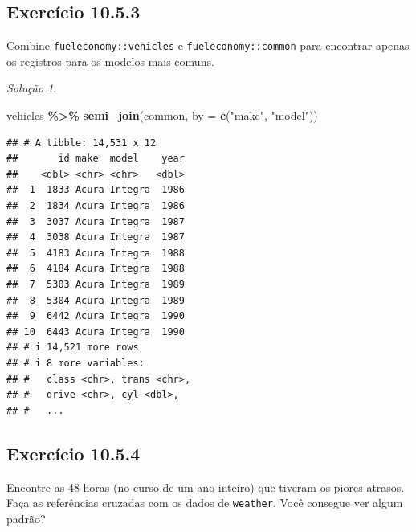 \documentclass[
]{latex/krantz}
\newenvironment{Shaded}{\begin{snugshade}}{\end{snugshade}}
\newcommand{\AttributeTok}[1]{\textcolor[rgb]{0.13,0.29,0.53}{#1}}
\newcommand{\FunctionTok}[1]{\textcolor[rgb]{0.13,0.29,0.53}{\textbf{#1}}}
\newcommand{\NormalTok}[1]{#1}
\newcommand{\SpecialCharTok}[1]{\textcolor[rgb]{0.81,0.36,0.00}{\textbf{#1}}}
\newcommand{\StringTok}[1]{\textcolor[rgb]{0.31,0.60,0.02}{#1}}
\theoremstyle{definition}
\theoremstyle{definition}
\theoremstyle{definition}
\theoremstyle{definition}
\theoremstyle{remark}
\newtheorem*{solution}{Solução}
\begin{document}
\hypertarget{exr10-5-3}{%
\subsection*{Exercício 10.5.3}\label{exr10-5-3}}

Combine \texttt{fueleconomy::vehicles} e \texttt{fueleconomy::common} para encontrar apenas os registros para os modelos mais comuns.

\begin{solution}
\leavevmode

\begin{Shaded}
\begin{Highlighting}[]
\NormalTok{vehicles }\SpecialCharTok{\%\textgreater{}\%}
  \FunctionTok{semi\_join}\NormalTok{(common, }\AttributeTok{by =} \FunctionTok{c}\NormalTok{(}\StringTok{"make"}\NormalTok{, }\StringTok{"model"}\NormalTok{))}
\end{Highlighting}
\end{Shaded}

\begin{verbatim}
## # A tibble: 14,531 x 12
##       id make  model    year
##    <dbl> <chr> <chr>   <dbl>
##  1  1833 Acura Integra  1986
##  2  1834 Acura Integra  1986
##  3  3037 Acura Integra  1987
##  4  3038 Acura Integra  1987
##  5  4183 Acura Integra  1988
##  6  4184 Acura Integra  1988
##  7  5303 Acura Integra  1989
##  8  5304 Acura Integra  1989
##  9  6442 Acura Integra  1990
## 10  6443 Acura Integra  1990
## # i 14,521 more rows
## # i 8 more variables:
## #   class <chr>, trans <chr>,
## #   drive <chr>, cyl <dbl>,
## #   ...
\end{verbatim}

\end{solution}

\hypertarget{exr10-5-4}{%
\subsection*{Exercício 10.5.4}\label{exr10-5-4}}

Encontre as 48 horas (no curso de um ano inteiro) que tiveram os piores atrasos. Faça as referências cruzadas com os dados de \texttt{weather}. Você consegue ver algum padrão?
\end{document}
